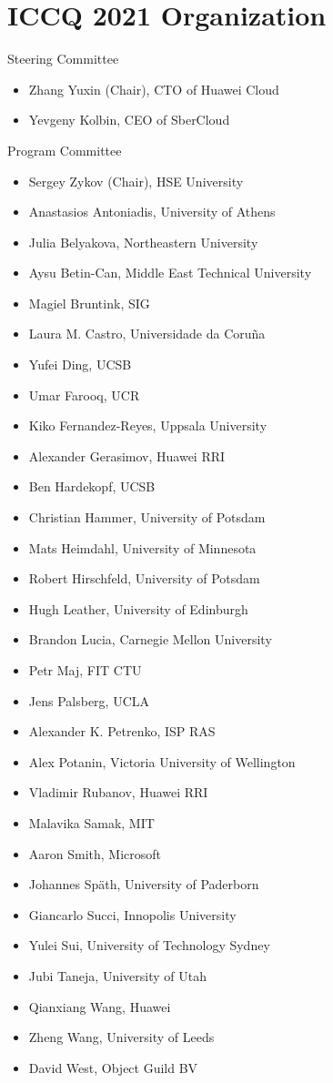 \cleardoublepage
\thispagestyle{empty}
\section{ICCQ 2021 Organization}

\begin{multicols}{2}
\raggedright
Steering Committee

\begin{itemize}
\item Zhang Yuxin (Chair), CTO of Huawei Cloud
\item Yevgeny Kolbin, CEO of SberCloud
\end{itemize}

Program Committee

\begin{itemize}
\item Sergey Zykov (Chair), HSE University
\item Anastasios Antoniadis, University of Athens
\item Julia Belyakova, Northeastern University
\item Aysu Betin-Can, Middle East Technical University
\item Magiel Bruntink, SIG
\item Laura M. Castro, Universidade da Coruña
\item Yufei Ding, UCSB
\item Umar Farooq, UCR
\item Kiko Fernandez-Reyes, Uppsala University
\item Alexander Gerasimov, Huawei RRI
\item Ben Hardekopf, UCSB
\item Christian Hammer, University of Potsdam
\item Mats Heimdahl, University of Minnesota
\item Robert Hirschfeld, University of Potsdam
\item Hugh Leather, University of Edinburgh
\item Brandon Lucia, Carnegie Mellon University
\item Petr Maj, FIT CTU
\item Jens Palsberg, UCLA
\item Alexander K. Petrenko, ISP RAS
\item Alex Potanin, Victoria University of Wellington
\item Vladimir Rubanov, Huawei RRI
\item Malavika Samak, MIT
\item Aaron Smith, Microsoft
\item Johannes Späth, University of Paderborn
\item Giancarlo Succi, Innopolis University
\item Yulei Sui, University of Technology Sydney
\item Jubi Taneja, University of Utah
\item Qianxiang Wang, Huawei
\item Zheng Wang, University of Leeds
\item David West, Object Guild BV
\end{itemize}


\end{multicols}
